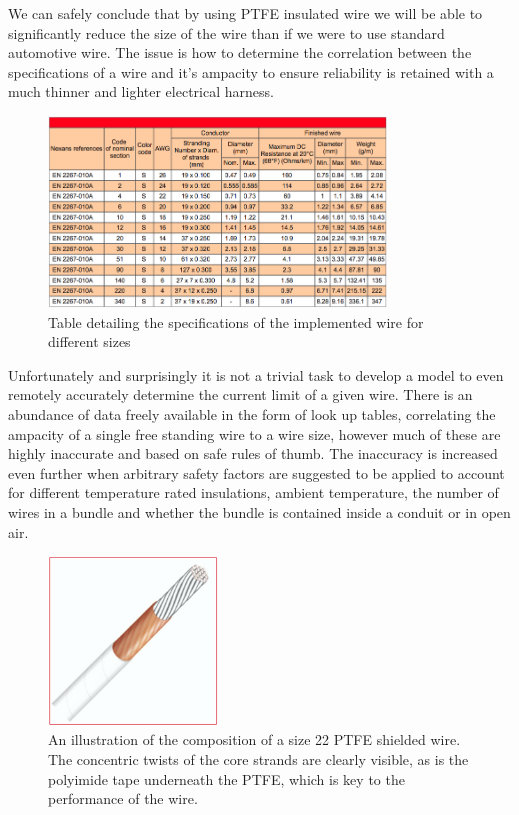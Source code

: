 We can safely conclude that by using PTFE insulated wire we will be able to significantly reduce the size of the wire than if we were to use standard automotive wire.  The issue is how to determine the correlation between the specifications of a wire and it's ampacity to ensure reliability is retained with a much thinner and lighter electrical harness.

\begin{figure}[h]
	\centering
	\includegraphics[width=0.8\textwidth]{DR22_Specs.png}
	\caption{Table detailing the specifications of the implemented wire for different sizes \cite{nexans_dr22}}
	\label{fig:nexans_dr22}
\end{figure}

Unfortunately and surprisingly it is not a trivial task to develop a model to even remotely accurately determine the current limit of a given wire.  There is an abundance of data freely available in the form of look up tables, correlating the ampacity of a single free standing wire to a wire size, however much of these are highly inaccurate and based on safe rules of thumb.  The inaccuracy is increased even further when arbitrary safety factors are suggested to be applied to account for different temperature rated insulations, ambient temperature, the number of wires in a bundle and whether the bundle is contained inside a conduit or in open air.

\begin{figure}[h]
	\centering
	\includegraphics[width=0.4\textwidth]{wire_cutaway.png}
	\caption{An illustration of the composition of a size 22 PTFE shielded wire.  The concentric twists of the core strands are clearly visible, as is the polyimide tape underneath the PTFE, which is key to the performance of the wire. \cite{nexans_dr22}}
	\label{fig:wire_cutaway}
\end{figure}

